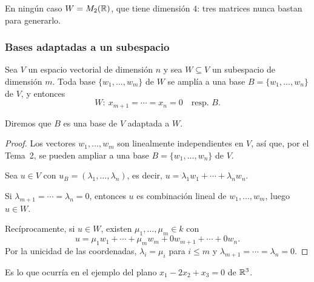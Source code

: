 \begin{frame}[allowframebreaks, t]
    \medskip

    En ningún caso $W=M_2(\mathbb{R})$, que tiene dimensión $4$: tres matrices
    nunca bastan para generarlo.
\end{frame}

\begin{frame}[allowframebreaks]
    \frametitle{Bases adaptadas a un subespacio}

    \begin{proposition}
        Sea $V$ un espacio vectorial de dimensión $n$ y sea $W\subseteq V$
        un subespacio de dimensión $m$. Toda base $\{w_1,\ldots,w_m\}$ de
        $W$ se amplía a una base $B=\{w_1,\ldots,w_n\}$ de $V$, y entonces
        \[
            W\colon\ x_{m+1}=\cdots=x_n=0\quad\text{resp.\ }B.
        \]
    \end{proposition}

    \medskip

    Diremos que $B$ es una base de $V$ \alert{adaptada} a $W$.

    \framebreak

    \begin{proof}
        Los vectores $w_1,\ldots,w_m$ son linealmente independientes en
        $V$, así que, por el Tema~2, se pueden ampliar a una base
        $B=\{w_1,\ldots,w_n\}$ de $V$.

        \medskip

        Sea $u\in V$ con $u_B=(\lambda_1,\ldots,\lambda_n)$, es decir,
        $u=\lambda_1w_1+\cdots+\lambda_nw_n$.

        \medskip

        Si $\lambda_{m+1}=\cdots=\lambda_n=0$, entonces $u$ es combinación
        lineal de $w_1,\ldots,w_m$, luego $u\in W$.

        \medskip

        Recíprocamente, si $u\in W$, existen $\mu_1,\ldots,\mu_m\in k$ con
        \[
            u=\mu_1w_1+\cdots+\mu_mw_m+0w_{m+1}+\cdots+0w_n.
        \]
        Por la unicidad de las coordenadas, $\lambda_i=\mu_i$ para
        $i\leq m$ y $\lambda_{m+1}=\cdots=\lambda_n=0$.
    \end{proof}

    \medskip

    Es lo que ocurría en el ejemplo del plano
    $x_1-2x_2+x_3=0$ de $\mathbb{R}^3$.
\end{frame}

